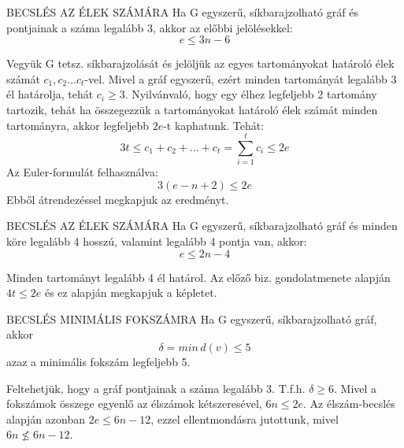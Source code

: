 \begin{tetel}{BECSLÉS AZ ÉLEK SZÁMÁRA}
Ha G egyszerű, síkbarajzolható gráf és pontjainak a száma legalább 3, akkor az előbbi jelölésekkel:
$$e \leq 3n - 6$$
\end{tetel}

\begin{bizonyitas}{}
Vegyük G tetsz. síkbarajzolását és jelöljük az egyes tartományokat határoló élek számát $c_1, c_2...c_t$-vel. Mivel a gráf egyszerű, ezért minden tartományát legalább 3 él határolja, tehát $c_i \geq 3$. Nyilvánvaló, hogy egy élhez legfeljebb 2 tartomány tartozik, tehát ha összegezzük a tartományokat határoló élek számát minden tartományra, akkor legfeljebb $2e$-t kaphatunk. Tehát:
$$3t \leq c_1 + c_2 + ... + c_t = \sum_{i=1}^{t} c_i \leq 2e$$
Az Euler-formulát felhasználva:
$$3(e - n + 2) \leq 2e$$
Ebből átrendezéssel megkapjuk az eredményt.
\end{bizonyitas}

\begin{tetel}{BECSLÉS AZ ÉLEK SZÁMÁRA}
Ha G egyszerű, síkbarajzolható gráf és minden köre legalább 4 hosszú, valamint legalább 4 pontja van, akkor:
$$e \leq 2n - 4$$
\end{tetel}

\begin{bizonyitas}{}
Minden tartományt legalább 4 él határol. Az előző biz. gondolatmenete alapján $4t \leq 2e$ és ez alapján megkapjuk a képletet.
\end{bizonyitas}

\begin{tetel}{BECSLÉS MINIMÁLIS FOKSZÁMRA}
Ha G egyszerű, síkbarajzolható gráf, akkor $$\delta = min\, d(v) \leq 5$$ azaz a minimális fokszám legfeljebb 5.
\end{tetel}

\begin{bizonyitas}{}
Feltehetjük, hogy a gráf pontjainak a száma legalább 3. T.f.h. $\delta \geq 6$. Mivel a fokszámok összege egyenlő az élszámok kétszeresével, $6n \leq 2e$. Az élszám-becslés alapján azonban $2e \leq 6n - 12$, ezzel ellentmondásra jutottunk, mivel $6n \not\leq 6n - 12$.
\end{bizonyitas}
